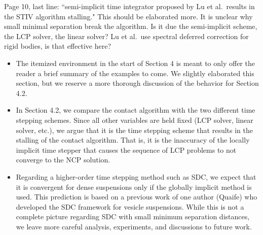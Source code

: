 \documentclass[11pt]{article}
\newcommand{\comment}[1]{{\color{blue} #1}}
\begin{document}
\noindent
\comment{Page 10, last line: ``semi-implicit time integrator proposed by
  Lu et al.~results in the STIV algorithm stalling." This should be
  elaborated more.  It is unclear why small minimal separation break the
  algorithm.  Is it due the semi-implicit scheme, the LCP solver, the
  linear solver?  Lu et al.~use spectral deferred correction for rigid
  bodies, is that effective here?}
\begin{itemize}
  \item The itemized environment in the start of Section 4 is meant to
    only offer the reader a brief summary of the examples to come.
    We slightly elaborated this section, but we reserve a more thorough
    discussion of the behavior for Section 4.2.

  \item In Section 4.2, we compare the contact algorithm with the two
    different time stepping schemes.  Since all other variables are held
    fixed (LCP solver, linear solver, etc.), we argue that it is the
    time stepping scheme that results in the stalling of the contact
    algorithm. That is, it is the inaccuracy of the locally implicit
    time stepper that causes the sequence of LCP problems to not
    converge to the NCP solution.

  \item Regarding a higher-order time stepping method such as SDC, we
    expect that it is convergent for dense suspensions only if the
    globally implicit method is used.  This prediction is based on a
    previous work of one author (Quaife) who developed the SDC framework
    for vesicle suspensions.  While this is not a complete picture
    regarding SDC with small minimum separation distances, we leave more
    careful analysis, experiments, and discussions to future work.

\end{itemize}
\end{document}

